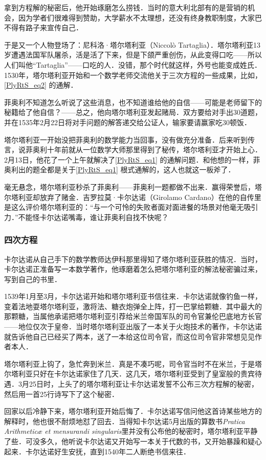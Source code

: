拿到方程解的秘密后，他开始琢磨怎么捞钱．当时的意大利北部有的是营销的机会，因为学者们很难得到赞助，大学薪水不太理想，还没有终身教职制度，大家巴不得有路子来宣传自己．

于是又一个人物登场了：尼科洛·塔尔塔利亚（Niccolò Tartaglia）．塔尔塔利亚13岁遭遇法国军队屠杀，活是活了下来，但是下颌严重创伤，从此变得口吃——所以人们叫他“Tartaglia”——口吃的人．没错，那个时代就这样，外号也能变成姓氏．1530年，塔尔塔利亚开始和一个数学老师交流他关于三次方程的一些成果，比如，\autoref{PlyRtS_eq2} 的通解．

菲奥利不知道怎么听说了这些消息，也不知道谁给他的自信——可能是老师留下的秘籍给了他自信？——总之，他向塔尔塔利亚发起赌局．双方要给对手出30道题，并在1535年2月22日将对手问题的解答递交给公证人，输家要请赢家吃30顿饭．

塔尔塔利亚一开始没把菲奥利的数学能力当回事，没有做充分准备．后来听到传言，说菲奥利十年前就从一位数学大师那里得到了秘传，塔尔塔利亚才开始上心．2月13日，他花了一个上午就解决了\autoref{PlyRtS_eq1} 的通解问题．和他想的一样，菲奥利出的题全都是关于\autoref{PlyRtS_eq1} 根式通解的，这人也就这一板斧了．

毫无悬念，塔尔塔利亚秒杀了菲奥利——菲奥利一题都做不出来．赢得荣誉后，塔尔塔利亚却放弃了赌金．吉罗拉莫·卡尔达诺（Girolamo Cardano）在他的自传里是这么评价塔尔塔利亚的：“与一个可怜的失败者面对面进餐的场景对他毫无吸引力．”不能怪卡尔达诺嘴毒，谁让菲奥利自找不快呢？

\subsubsection{四次方程}

卡尔达诺从自己手下的数学教师达伊科那里得知了塔尔塔利亚获胜的情况．当时，卡尔达诺正准备写一本数学著作，他琢磨着怎么把塔尔塔利亚的解法秘密骗过来，写到自己的书里．

1539年1月至3月，卡尔达诺开始和塔尔塔利亚书信往来．卡尔达诺就像钓鱼一样，变着法地耍塔尔塔利亚，激将法、糖衣炮弹全上阵，打一巴掌给颗糖．其中最大的那颗糖，当属他承诺把塔尔塔利亚引荐给米兰帝国军队的司令官兼伦巴底地方长官——地位仅次于皇帝．当时塔尔塔利亚出版了一本关于火炮技术的著作，卡尔达诺就告诉他自己已经买了两本，送了一本给这位司令官，而这位司令官非常想见见作者本人．

塔尔塔利亚上钩了，急忙奔到米兰．真是不凑巧呢，司令官当时不在米兰，于是塔尔塔利亚只好在卡尔达诺家住了几天．这几天，塔尔塔利亚受到了皇室般的贵宾待遇．3月25日时，上头了的塔尔塔利亚让卡尔达诺发誓不公布三次方程解的秘密，然后用一首25行诗写下了这个秘密．

回家以后冷静下来，塔尔塔利亚开始后悔了．卡尔达诺写信问他这首诗某些地方的解释时，他也很不耐烦地怼了回去．当得知卡尔达诺5月出版的算数书\textsl{Pratica Arithmeticæ et mensurandi singularis}里并没有公布他的秘密时，塔尔塔利亚平静了些．可没多久，他听说卡尔达诺又开始写一本关于代数的书，又开始暴躁和疑心起来．卡尔达诺好生安抚，直到1540年二人断绝书信来往．

